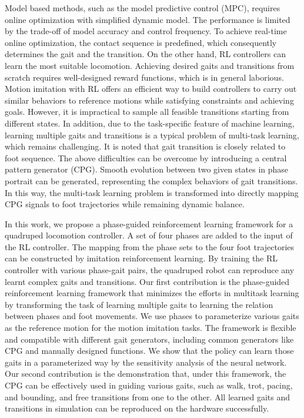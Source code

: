 \documentclass[letterpaper, 10 pt, journal, twoside]{IEEEtran} %
\begin{document}
Model based methods, such as the model predictive control (MPC), requires online optimization with simplified dynamic model. The performance is limited by the trade-off of model accuracy and control frequency. To achieve real-time online optimization, the contact sequence is predefined, which consequently determines the gait and the transition.\cite{8594448,kim2019highly} On the other hand, RL controllers can learn the most suitable locomotion. Achieving desired gaits and transitions from scratch requires well-designed reward functions, which is in general laborious. Motion imitation with RL offers an efficient way to build controllers to carry out similar behaviors to reference motions while satisfying constraints and achieving goals.\cite{2018-TOG-deepMimic} However, it is impractical to sample all feasible transitions starting from different states. In addition, due to the task-specific feature of machine learning, learning multiple gaits and transitions is a typical problem of multi-task learning, which remains challenging. It is noted that gait transition is closely related to foot sequence. The above difficulties can be overcome by introducing a central pattern generator (CPG). Smooth evolution between two given states in phase portrait can be generated, representing the complex behaviors of gait transitions.\cite{IJSPEERT2008642,Fukuoka2015,10.3389/fnbot.2016.00006} In this way, the multi-task learning problem is transformed into directly mapping CPG signals to foot trajectories while remaining dynamic balance.

In this work, we propose a phase-guided reinforcement learning framework for a quadruped locomotion controller. A set of four phases are added to the input of the RL controller. The mapping from the phase sets to the four foot trajectories can be constructed by imitation reinforcement learning. By training the RL controller with various phase-gait pairs, the quadruped robot can reproduce any learnt complex gaits and transitions. Our first contribution is the phase-guided reinforcement learning framework that minimizes the efforts in multitask learning by transforming the task of learning multiple gaits to learning the relation between phases and foot movements. We use phases to parameterize various gaits as the reference motion for the motion imitation tasks. The framework is flexible and compatible with different gait generators, including common generators like CPG and manually designed functions. We show that the policy can learn those gaits in a parameterized way by the sensitivity analysis of the neural network. Our second contribution is the demonstration that, under this framework, the CPG can be effectively used in guiding various gaits, such as walk, trot, pacing, and bounding, and free transitions from one to the other. All learned gaits and transitions in simulation can be reproduced on the hardware successfully.
\end{document}
